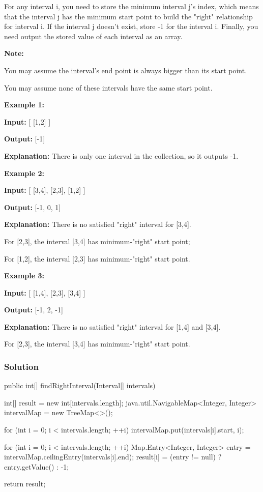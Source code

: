 For any interval i, you need to store the minimum interval j's index, which means that the interval j has the minimum start point to build the "right" relationship for interval i. If the interval j doesn't exist, store -1 for the interval i. Finally, you need output the stored value of each interval as an array.

\textbf{Note:}

You may assume the interval's end point is always bigger than its start point.

You may assume none of these intervals have the same start point.

\textbf{Example 1:}

\textbf{Input:} [ [1,2] ]

\textbf{Output:} [-1]

\textbf{Explanation:} There is only one interval in the collection, so it outputs -1.

\textbf{Example 2:}

\textbf{Input:} [ [3,4], [2,3], [1,2] ]

\textbf{Output:} [-1, 0, 1]

\textbf{Explanation:} There is no satisfied "right" interval for [3,4].

For [2,3], the interval [3,4] has minimum-"right" start point;

For [1,2], the interval [2,3] has minimum-"right" start point.

\textbf{Example 3:}

\textbf{Input:} [ [1,4], [2,3], [3,4] ]

\textbf{Output:} [-1, 2, -1]

\textbf{Explanation:} There is no satisfied "right" interval for [1,4] and [3,4].

For [2,3], the interval [3,4] has minimum-"right" start point.

\subsubsection{Solution}

\begin{Code}
public int[] findRightInterval(Interval[] intervals) {
    int[] result = new int[intervals.length];
    java.util.NavigableMap<Integer, Integer> intervalMap = new TreeMap<>();

    for (int i = 0; i < intervals.length; ++i) {
        intervalMap.put(intervals[i].start, i);
    }

    for (int i = 0; i < intervals.length; ++i) {
        Map.Entry<Integer, Integer> entry = intervalMap.ceilingEntry(intervals[i].end);
        result[i] = (entry != null) ? entry.getValue() : -1;
    }

    return result;
}
\end{Code}